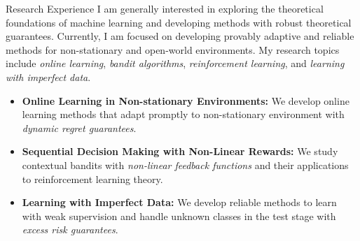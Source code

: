 \documentclass{resume} %
\begin{document}
\begin{rSection}{Research Experience}
	I am generally interested in exploring the theoretical foundations of machine learning and developing methods with robust theoretical guarantees. Currently, I am focused on developing provably adaptive and reliable methods for non-stationary and open-world environments. My research topics include \emph{online learning}, \emph{bandit algorithms}, \emph{reinforcement learning}, and \emph{learning with imperfect data}.
\begin{itemize}
	\item \textbf{Online Learning in Non-stationary Environments:} We develop online learning methods that adapt promptly to non-stationary environment with \emph{dynamic regret guarantees}.
	\item \textbf{Sequential Decision Making with Non-Linear Rewards:} We study contextual bandits with \emph{non-linear feedback functions} and their applications to reinforcement learning theory.
	\item \textbf{Learning with Imperfect Data:} We develop reliable methods to learn with weak supervision and handle unknown classes in the test stage with \emph{excess risk guarantees}.
\end{itemize}
\end{rSection}
	
\end{document}
